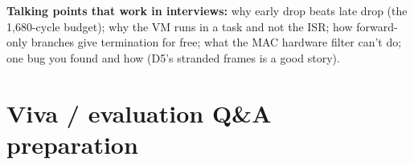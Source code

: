 \documentclass[10pt,a4paper]{article}
\begin{document}
\textbf{Talking points that work in interviews:} why early drop beats late drop (the 1,680-cycle budget); why the VM runs in a task and not the ISR; how forward-only branches give termination for free; what the MAC hardware filter can't do; one bug you found and how (D5's stranded frames is a good story).

\section{Viva / evaluation Q\&A preparation}
\newcommand{\qa}[2]{\textbf{Q: #1}\par\vspace{-1pt}\emph{A:} #2\par\vspace{3pt}}
\end{document}
